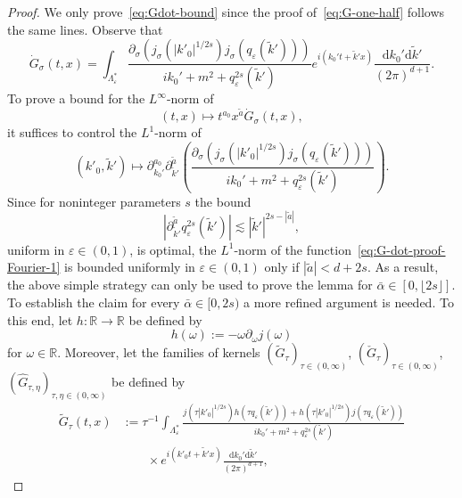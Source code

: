 \documentclass{article}
\numberwithin{equation}{section}
\newcommand{\assign}{:=}
\newcommand{\mathd}{\mathrm{d}}
\theoremstyle{plain}
\theoremstyle{definition}
\begin{document}
\begin{proof}
  We only prove~\eqref{eq:Gdot-bound} since the proof of~\eqref{eq:G-one-half}
  follows the same lines. Observe that
  \[ \dot{G}_{\sigma} (t, x) = \int_{\Lambda^{\ast}_{\varepsilon}}
     \frac{\partial_{\sigma} (j_{\sigma} (| k'_0 |^{1 / 2 s}) j_{\sigma}
     (q_{\varepsilon} (\tilde{k}')))}{i k_0' +
     m^2 + q_{\varepsilon}^{2 s} (\tilde{k}')} e^{i (k_0' t + \tilde{k}' x)}
     \frac{\mathd k_0' \mathd \tilde{k}'}{(2 \pi)^{d + 1}} . \]
  To prove a bound for the $L^{\infty}$-norm of
  \[ (t, x) \mapsto t^{a_0} x^{\tilde{a}} \dot{G}_{\sigma} (t, x),
  \]
  it suffices to control the $L^1$-norm of
  \begin{equation}
    (k'_0, \tilde{k}') \mapsto \partial_{k_0'}^{a_0} \partial_{\tilde{k}'}^{\tilde{a}}
    \left( \frac{\partial_{\sigma} (j_{\sigma} (| k'_0 |^{1 / 2 s}) j_{\sigma}
    (q_{\varepsilon} (\tilde{k}')))}{i k_0' +
    m^2 + q_{\varepsilon}^{2 s} (\tilde{k}')} \right) .
    \label{eq:G-dot-proof-Fourier-1}
  \end{equation}
  Since for noninteger parameters $s$ the bound
  \[ | \partial_{\tilde{k}'}^{\tilde{a}} q_{\varepsilon}^{2 s} (\tilde{k}') |
     \lesssim | \tilde{k}' |^{2 s - | \tilde{a} |}, \]
  uniform in $\varepsilon \in (0, 1)$, is optimal, the $L^1$-norm of the
  function~\eqref{eq:G-dot-proof-Fourier-1} is bounded uniformly in
  $\varepsilon \in (0, 1)$ only if $| \tilde{a} | < d + 2 s$. As a result, the
  above simple strategy can only be used to prove the lemma for $\bar\alpha \in
  [0, \lfloor 2 s \rfloor]$. To establish the claim for every $\bar\alpha \in [0,
  2 s)$ a more refined argument is needed. To this end, let $h : \mathbb{R}
  \rightarrow \mathbb{R}$ be defined by
  \[ h (\omega) \assign - \omega \partial_{\omega} j (\omega) \]
  for $\omega \in \mathbb{R}$. Moreover, let the families of kernels
  $(\tilde{G}_{\tau})_{\tau \in (0, \infty)}$, $(\check{G}_{\tau})_{\tau \in
  (0, \infty)}$, $(\hat{G}_{\tau, \eta})_{\tau, \eta \in (0, \infty)}$ be
  defined by
  \begin{align*}
       \tilde{G}_{\tau} (t, x)
       &\assign \tau^{- 1}
       \int_{\Lambda^{\ast}_{\varepsilon}}
       \frac{j \left( \tau | k'_0 |^{1 / 2 s}  \right)
       h (\tau q_{\varepsilon} (\tilde{k}') )
       + h \left( \tau | k'_0 |^{1 / 2 s}  \right)
       j (\tau q_{\varepsilon} (\tilde{k}') )}
       {i k_0' + m^2 + q^{2 s}_{\varepsilon}(\tilde{k}')}\\
       &\qquad \times
       e^{i (k'_0 t + \tilde{k}' x)}
       \frac{\mathd k_0' \mathd \tilde{k}'}{(2 \pi)^{d + 1}},

\end{align*}
\end{proof}
\end{document}

